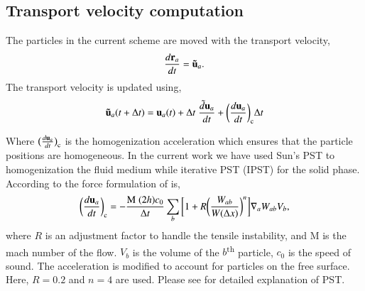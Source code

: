 \subsection{Transport velocity computation}\label{subsec:transport-velocity}
The particles in the current scheme are moved with the transport velocity,
\begin{equation}
  \label{eq:transport_velocity_position_derivative}
  \frac{d\mathbf{r}_a}{dt} = \mathbf{\tilde{u}}_a.
\end{equation}
%
The transport velocity is updated using,
\begin{equation}
  \label{eq:transport_velocity}
  \mathbf{\tilde{u}}_a(t + \Delta t) =\mathbf{u}_a(t) + \Delta t \; \frac{\tilde{d} \mathbf{u}_a}{dt} +
  \bigg(\frac{d \mathbf{u}_{a}}{dt}\bigg)_{\text{c}} \Delta t
\end{equation}

Where $\big(\frac{d \mathbf{u}_a}{dt}\big)_{\text{c}}$ is the homogenization
acceleration which ensures that the particle positions are homogeneous. In the
current work we have used Sun's \citep{sun_consistent_2019} PST to homogenization
the fluid medium while iterative PST (IPST)\citep{huang_kernel_2019} for the
solid phase. According to \citep{adepu2021corrected} the force formulation of
\citep{sun_consistent_2019} is,
\begin{equation}
  \label{eq:sun2019_pst}
  \bigg(\frac{d \mathbf{u}_a}{dt}\bigg)_{\text{c}} = - \frac{\text{M} \;
    (2h) c_0}{\Delta t} \sum_b \bigg[1 + R \bigg( \frac{W_{ab}}{W(\Delta x)} \bigg)^n
  \bigg] \nabla_a W_{ab} V_b,
\end{equation}
where $R$ is an adjustment factor to handle the tensile instability, and
$\text{M}$ is the mach number of the flow. $V_b$ is the volume of the
$b$\textsuperscript{th} particle, $c_0$ is the speed of sound. The acceleration is modified to account for
particles on the free surface. Here, $R = 0.2$ and $n = 4$ are used. Please see
\citep{adepu2021corrected} for detailed explanation of PST.

